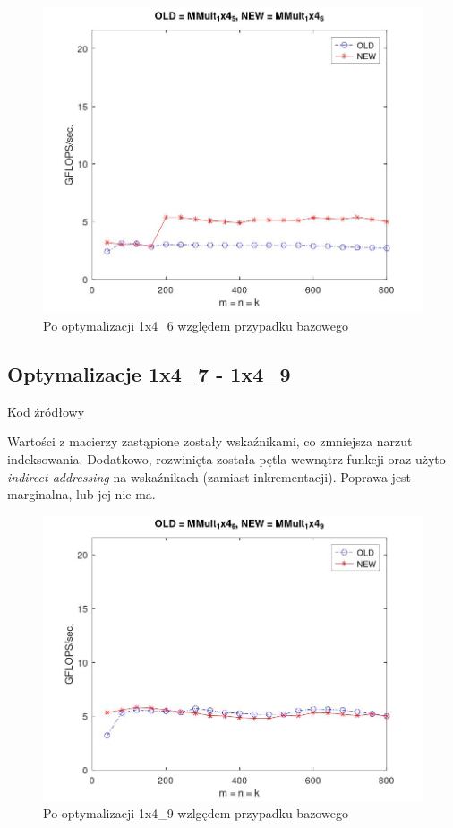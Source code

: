 \documentclass{article}
\begin{document}
\begin{figure}[H]
    \centering
    \includegraphics[width=1.0\textwidth]{figure3.jpg}
    \caption{Po optymalizacji 1x4\_6 względem przypadku bazowego}
\end{figure}

\subsection{Optymalizacje 1x4\_7 - 1x4\_9}

\href{https://github.com/flame/how-to-optimize-gemm/blob/master/src/MMult_1x4_9.c}{Kod źródłowy}

Wartości z macierzy  zastąpione zostały wskaźnikami, co zmniejsza narzut indeksowania.
Dodatkowo, rozwinięta została pętla wewnątrz funkcji  oraz użyto \textit{indirect addressing}
na wskaźnikach (zamiast inkrementacji). Poprawa jest marginalna, lub jej nie ma.

\begin{figure}[H]
    \centering
    \includegraphics[width=1.0\textwidth]{figure4.jpg}
    \caption{Po optymalizacji 1x4\_9 wzlgędem przypadku bazowego}
\end{figure}
\end{document}
